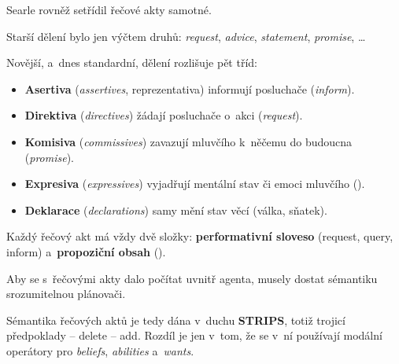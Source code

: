 \documentclass[11pt,a4paper]{article}
\theoremstyle{definition}
\begin{document}
Searle rovněž setřídil řečové akty samotné.

\begin{defbox}
Starší dělení bylo jen výčtem druhů: \emph{request}, \emph{advice}, \emph{statement},
\emph{promise}, \dots

Novější, a~dnes standardní, dělení rozlišuje pět tříd:
\begin{itemize}
\item \textbf{Asertiva} (\emph{assertives}, reprezentativa) informují posluchače
  (\emph{inform}).
\item \textbf{Direktiva} (\emph{directives}) žádají posluchače o~akci (\emph{request}).
\item \textbf{Komisiva} (\emph{commissives}) zavazují mluvčího k~něčemu do budoucna
  (\emph{promise}).
\item \textbf{Expresiva} (\emph{expressives}) vyjadřují mentální stav či emoci mluvčího
  ().
\item \textbf{Deklarace} (\emph{declarations}) samy mění stav věcí (válka, sňatek).
\end{itemize}
Každý řečový akt má vždy dvě složky: \textbf{performativní sloveso} (request, query, inform)
a~\textbf{propoziční obsah} ().
\end{defbox}

Aby se s~řečovými akty dalo počítat uvnitř agenta, musely dostat sémantiku srozumitelnou
plánovači.

\begin{defbox}

Sémantika řečových aktů je tedy dána v~duchu \textbf{STRIPS}, totiž trojicí
předpoklady -- delete -- add. Rozdíl je jen v~tom, že se v~ní používají modální operátory pro
\emph{beliefs}, \emph{abilities} a~\emph{wants}.
\end{defbox}
\end{document}
